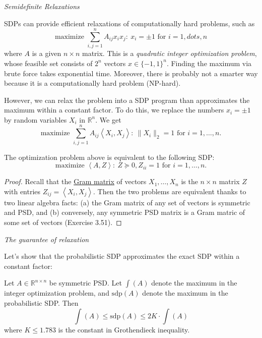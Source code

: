 \begin{center}
	\textit{Semidefinite Relaxations}
\end{center}

SDPs can provide efficient relaxations of computationally hard problems, such as 
\[ \text{maximize } \sum_{i, j = 1}^{n}A_{ij}x_ix_j: \ x_i = \pm 1 \text{ for } i = 1, dots, n \]
where $A$ is a given $n \times n$ matrix. This is a \textit{quadratic integer optimization problem}, whose 
feasible set consists of $2^n$ vectors $x \in \{-1, 1\}^n$. Finding the maximum via brute force takes 
exponential time. Moreover, there is probably not a smarter way because it is a computationally hard problem 
(NP-hard).

However, we can relax the problem into a SDP program than approximates the maximum within a constant factor. 
To do this, we replace the numbers $x_i = \pm 1$ by random variables $X_i$ in $\mathbb{R}^n$. We get 
\[ \text{maximize } \sum_{i, j = 1}^{n}A_{ij}\left\langle X_i, X_j \right\rangle: 
\ \lVert X_i \rVert_{2} = 1 \text{ for } i = 1, \dots, n. \]

\begin{proposition}
\label{prop:3.5.6}
The optimization problem above is equivalent to the following SDP:
\[ \text{maximize } \left\langle A, Z \right\rangle: \ Z \succeq 0, Z_{ii} = 1 \text{ for } i = 1, \dots, n. \]
\end{proposition}

\begin{proof}
Recall that the \underline{Gram matrix} of vectors $X_1, \dots, X_n$ is the $n \times n$ matrix $Z$ with entries 
$Z_{ij} = \left\langle X_i, X_j \right\rangle$. Then the two problems are equivalent thanks to two linear 
algebra facts: (a) the Gram matrix of any set of vectors is symmetric and PSD, and (b) conversely, any 
symmetric PSD matrix is a Gram matric of some set of vectors (Exercise 3.51).
\end{proof}

\begin{center}
	\textit{The guarantee of relaxation}
\end{center}

Let's show that the probabilistic SDP approximates the exact SDP within a constant factor:

\begin{theorem}[]
\label{thm:3.5.7}
Let $A \in \mathbb{R}^{n \times n}$ be symmetric PSD. Let $\mathrm{\int}(A)$ denote the maximum in the integer 
optimization problem, and $\mathrm{sdp}(A)$ denote the maximum in the probabilistic SDP. Then 
\[ \mathrm{\int}(A) \leq \mathrm{sdp}(A) \leq 2K \cdot \mathrm{\int}(A) \]
where $K \leq 1.783$ is the constant in Grothendieck inequality.
\end{theorem}

